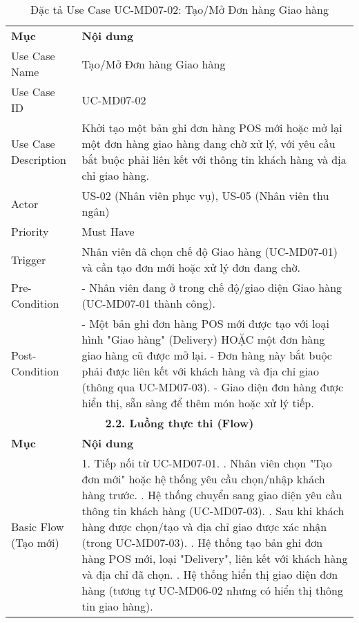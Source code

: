 \begin{longtable}{|m{4cm}|p{11cm}|}
\caption{Đặc tả Use Case UC-MD07-02: Tạo/Mở Đơn hàng Giao hàng} \label{tab:uc_md07_02} \\
\hline

\endhead %
\hline
\endfoot %
\hline
\endlastfoot %
\multicolumn{2}{|c|}{\textbf{2.1. Tóm tắt (Summary)}} \\
\hline
\textbf{Mục} & \textbf{Nội dung} \\
\hline
Use Case Name & Tạo/Mở Đơn hàng Giao hàng \\
\hline
Use Case ID & UC-MD07-02 \\
\hline
Use Case Description & Khởi tạo một bản ghi đơn hàng POS mới hoặc mở lại một đơn hàng giao hàng đang chờ xử lý, với yêu cầu bắt buộc phải liên kết với thông tin khách hàng và địa chỉ giao hàng. \\
\hline
Actor & US-02 (Nhân viên phục vụ), US-05 (Nhân viên thu ngân) \\
\hline
Priority & Must Have \\
\hline
Trigger & Nhân viên đã chọn chế độ Giao hàng (UC-MD07-01) và cần tạo đơn mới hoặc xử lý đơn đang chờ. \\
\hline
Pre-Condition & - Nhân viên đang ở trong chế độ/giao diện Giao hàng (UC-MD07-01 thành công). \\
\hline
Post-Condition & - Một bản ghi đơn hàng POS mới được tạo với loại hình "Giao hàng" (Delivery) HOẶC một đơn hàng giao hàng cũ được mở lại. \newline - Đơn hàng này bắt buộc phải được liên kết với khách hàng và địa chỉ giao (thông qua UC-MD07-03). \newline - Giao diện đơn hàng được hiển thị, sẵn sàng để thêm món hoặc xử lý tiếp. \\
\hline
\multicolumn{2}{|c|}{\textbf{2.2. Luồng thực thi (Flow)}} \\
\hline
\textbf{Mục} & \textbf{Nội dung} \\
\hline
Basic Flow (Tạo mới) & 1. Tiếp nối từ UC-MD07-01. \newline 2. Nhân viên chọn "Tạo đơn mới" hoặc hệ thống yêu cầu chọn/nhập khách hàng trước. \newline 3. Hệ thống chuyển sang giao diện yêu cầu thông tin khách hàng (UC-MD07-03). \newline 4. Sau khi khách hàng được chọn/tạo và địa chỉ giao được xác nhận (trong UC-MD07-03). \newline 5. Hệ thống tạo bản ghi đơn hàng POS mới, loại "Delivery", liên kết với khách hàng và địa chỉ đã chọn. \newline 6. Hệ thống hiển thị giao diện đơn hàng (tương tự UC-MD06-02 nhưng có hiển thị thông tin giao hàng). \\

\end{longtable}
